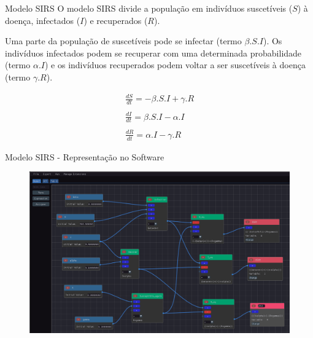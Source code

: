 \begin{frame}{Modelo SIRS}
    O modelo SIRS divide a população em indivíduos suscetíveis ($S$) à doença, infectados ($I$) e recuperados ($R$).
    
    Uma parte da população de suscetíveis pode se infectar (termo $\beta.S.I$). Os indivíduos infectados podem se recuperar com uma determinada probabilidade (termo $\alpha.I$) e os indivíduos recuperados podem voltar a ser suscetíveis à doença (termo $\gamma.R$). 
    
    \begin{equation}\label{eq:sirs}
        \begin{array}{lr}
        \frac{dS}{dt} = -\beta.S.I + \gamma.R
        \\
        \\
        \frac{dI}{dt} = \beta.S.I - \alpha.I
        \\
        \\ 
        \frac{dR}{dt} = \alpha.I - \gamma.R
        \end{array}
    \end{equation}
\end{frame}

\begin{frame}{Modelo SIRS - Representação no Software}
    \begin{figure}
        \centering
        \includegraphics[height=\textheight]{contents/imgs/modelos/sirs.png}
    \end{figure}
\end{frame}

